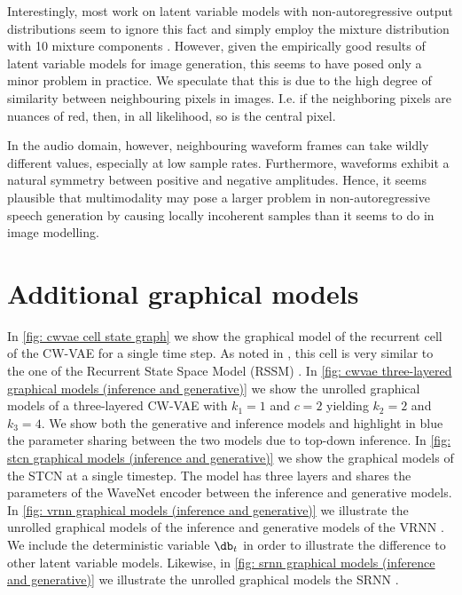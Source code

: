 {Interestingly, most work on latent variable models with non-autoregressive output distributions seem to ignore this fact and simply employ the mixture distribution with 10 mixture components \cite{maaloe_biva_2019, vahdat_nvae_2020, child_very_2021}.
However, given the empirically good results of latent variable models for image generation, this seems to have posed only a minor problem in practice. We speculate that this is due to the high degree of similarity between neighbouring pixels in images. I.e. if the neighboring pixels are nuances of red, then, in all likelihood, so is the central pixel.

In the audio domain, however, neighbouring waveform frames can take wildly different values, especially at low sample rates. Furthermore, waveforms exhibit a natural symmetry between positive and negative amplitudes.
Hence, it seems plausible that multimodality may pose a larger problem in non-autoregressive speech generation by causing locally incoherent samples than it seems to do in image modelling.


\section{Additional graphical models}\label{app: additional graphical models}
In \cref{fig: cwvae cell state graph} we show the graphical model of the recurrent cell of the CW-VAE for a single time step. As noted in \cite{saxena_clockwork_2021}, this cell is very similar to the one of the Recurrent State Space Model (RSSM) \cite{hafner_learning_2019}.
In \cref{fig: cwvae three-layered graphical models (inference and generative)} we show the unrolled graphical models of a three-layered CW-VAE with $k_1=1$ and $c=2$ yielding $k_2=2$ and $k_3=4$. 
We show both the generative and inference models and highlight in blue the parameter sharing between the two models due to top-down inference.
In \cref{fig: stcn graphical models (inference and generative)} we show the graphical models of the STCN \cite{aksan_stcn_2019} at a single timestep. The model has three layers and shares the parameters of the WaveNet encoder between the inference and generative models.
In \cref{fig: vrnn graphical models (inference and generative)} we illustrate the unrolled graphical models of the inference and generative models of the VRNN \cite{chung_recurrent_2015}. We include the deterministic variable $\db_t$ in order to illustrate the difference to other latent variable models.
Likewise, in \cref{fig: srnn graphical models (inference and generative)} we illustrate the unrolled graphical models the SRNN \cite{fraccaro_sequential_2016}.


}

